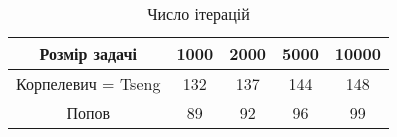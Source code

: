 \begin{table}[H]
	\centering
	\begin{tabular}{|c||c|c|c|c|}\hline
		Розмір задачі & 1000 & 2000 & 5000 & 10000 \\ \hline \hline
		Корпелевич = Tseng & 132 & 137 & 144 & 148 \\ \hline
		Попов & 89 & 92 & 96 & 99 \\ \hline
	\end{tabular}
	\caption{Число ітерацій}
\end{table}

